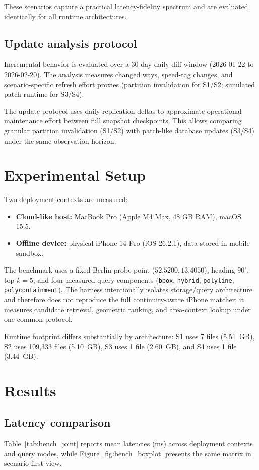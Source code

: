 \documentclass[conference]{IEEEtran}
\begin{document}
These scenarios capture a practical latency-fidelity spectrum and are evaluated identically for all runtime architectures.

\subsection{Update analysis protocol}
Incremental behavior is evaluated over a 30-day daily-diff window (2026-01-22 to 2026-02-20). The analysis measures changed ways, speed-tag changes, and scenario-specific refresh effort proxies (partition invalidation for S1/S2; simulated patch runtime for S3/S4).

The update protocol uses daily replication deltas to approximate operational maintenance effort between full snapshot checkpoints. This allows comparing granular partition invalidation (S1/S2) with patch-like database updates (S3/S4) under the same observation horizon.

\section{Experimental Setup}
Two deployment contexts are measured:
\begin{itemize}
\item \textbf{Cloud-like host:} MacBook Pro (Apple M4 Max, 48 GB RAM), macOS 15.5.
\item \textbf{Offline device:} physical iPhone 14 Pro (iOS 26.2.1), data stored in mobile sandbox.
\end{itemize}

The benchmark uses a fixed Berlin probe point (\(52.5200,13.4050\)), heading \(90^\circ\), top-\(k=5\), and four measured query components (\texttt{bbox}, \texttt{hybrid}, \texttt{polyline}, \texttt{polycontainment}). The harness intentionally isolates storage/query architecture and therefore does not reproduce the full continuity-aware iPhone matcher; it measures candidate retrieval, geometric ranking, and area-context lookup under one common protocol.

Runtime footprint differs substantially by architecture: S1 uses 7 files (\SI{5.51}{GB}), S2 uses 109{,}333 files (\SI{5.10}{GB}), S3 uses 1 file (\SI{2.60}{GB}), and S4 uses 1 file (\SI{3.44}{GB}).

\section{Results}
\subsection{Latency comparison}
Table~\ref{tab:bench_joint} reports mean latencies (ms) across deployment contexts and query modes, while Figure~\ref{fig:bench_boxplot} presents the same matrix in scenario-first view.
\end{document}
